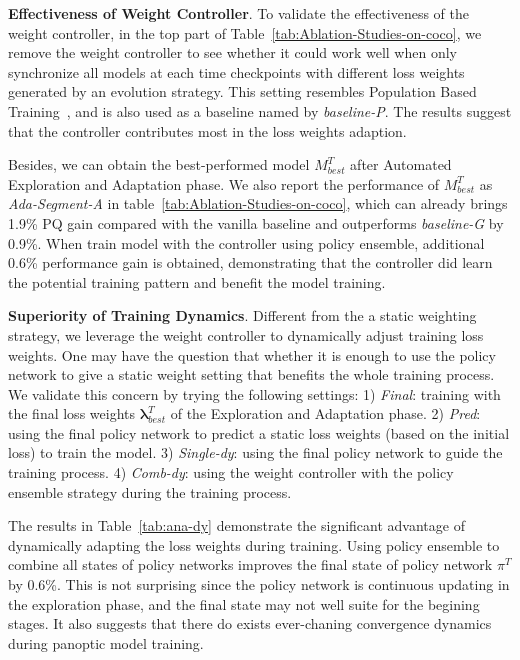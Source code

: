 \documentclass[letterpaper]{article} \usepackage{aaai21}  \usepackage{times}  \usepackage{helvet} \usepackage{courier}  \usepackage[hyphens]{url}  \usepackage{graphicx} \urlstyle{rm} \def\UrlFont{\rm}  \usepackage{natbib}  \usepackage{caption} \frenchspacing  \setlength{\pdfpagewidth}{8.5in}  \setlength{\pdfpageheight}{11in}
\begin{document}
 \noindent
 \textbf{Effectiveness of Weight Controller}.
 To validate the effectiveness of the weight controller, in the top part of 
 Table~\ref{tab:Ablation-Studies-on-coco},
 we remove the weight controller to see whether it could work well when
 only synchronize all models at each time checkpoints with different loss weights 
 generated by an evolution strategy. 
 This setting resembles Population Based Training~\cite{jaderberg2017pbt}, 
 and is also used as a baseline named by \textit{baseline-P}. 
 The results suggest that the controller contributes most 
 in the loss weights adaption.

 Besides, we can obtain the best-performed model $M^T_{best}$ after Automated Exploration 
 and Adaptation phase. We also 
 report the performance of $M^T_{best}$ as \textit{Ada-Segment-A} in table~\ref{tab:Ablation-Studies-on-coco}, 
 which can already brings 1.9\% PQ gain compared with the vanilla baseline and outperforms 
 \textit{baseline-G} by 0.9\%. When train model with 
 the controller using policy ensemble, additional 0.6\% performance gain is obtained, demonstrating 
 that the controller did learn the potential training pattern and benefit the model training. 
 
 


 \noindent
 \textbf{Superiority of Training Dynamics}.
 Different from the a static weighting strategy, we leverage the weight controller 
 to dynamically adjust training loss weights. 
 One may have the question that whether it is enough to use the policy network to give a 
 static weight setting that benefits the whole training process. We validate this concern
 by trying the following settings:
 1) \textit{Final}: training with the final loss weights $\boldsymbol{\lambda}_{best}^T$ of the Exploration and Adaptation phase. 
2) \textit{Pred}: using the final policy network to predict a static loss weights (based on the initial loss) 
 to train the model.  
 3) \textit{Single-dy}: using the final policy network to guide the training process.
 4) \textit{Comb-dy}: using the weight controller with the policy ensemble strategy 
 during the training process. 
 
 The results in Table~\ref{tab:ana-dy} demonstrate the significant advantage of
 dynamically adapting the loss weights during training. 
 Using policy ensemble to combine all states of policy networks improves the 
 final state of policy network $\pi^T$ by 0.6\%. This is not surprising since the policy network 
 is continuous updating in the exploration phase, and the final state may not well suite for 
 the begining stages. It also suggests that there do exists ever-chaning convergence dynamics 
 during panoptic model training.
\end{document}
